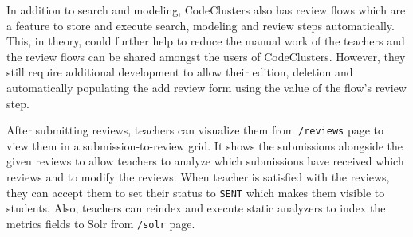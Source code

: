 In addition to search and modeling, CodeClusters also has review flows which are a feature to store and execute search, modeling and review steps automatically. This, in theory, could further help to reduce the manual work of the teachers and the review flows can be shared amongst the users of CodeClusters. However, they still require additional development to allow their edition, deletion and automatically populating the add review form using the value of the flow's review step.

After submitting reviews, teachers can visualize them from \texttt{/reviews} page to view them in a submission-to-review grid. It shows the submissions alongside the given reviews to allow teachers to analyze which submissions have received which reviews and to modify the reviews. When teacher is satisfied with the reviews, they can accept them to set their status to \texttt{SENT} which makes them visible to students. Also, teachers can reindex and execute static analyzers to index the metrics fields to Solr from \texttt{/solr} page.
